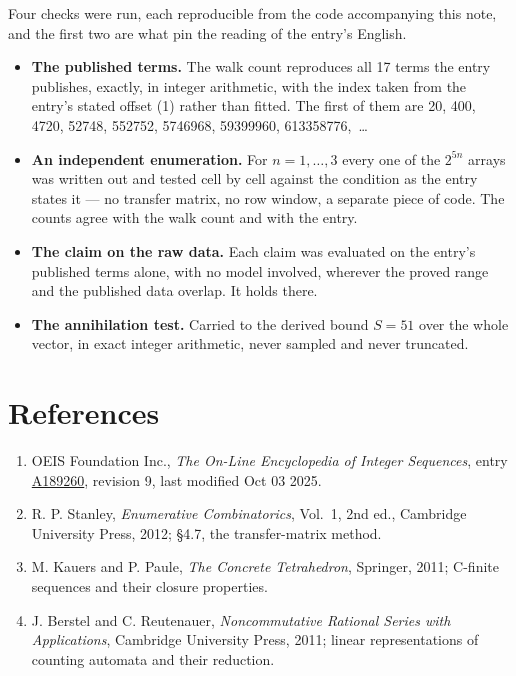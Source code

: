 \documentclass[11pt]{article}
\theoremstyle{definition}
\begin{document}
Four checks were run, each reproducible from the code accompanying this note, and the first two are what pin the reading of the entry's English.

\begin{itemize}

\item {\bfseries The published terms.} The walk count reproduces all 17 terms the entry publishes, exactly, in integer arithmetic, with the index taken from the entry's stated offset (1) rather than fitted. The first of them are 20, 400, 4720, 52748, 552752, 5746968, 59399960, 613358776,~\dots

\item {\bfseries An independent enumeration.} For $n = 1,\dots,3$ every one of the $2^{5n}$ arrays was written out and tested cell by cell against the condition as the entry states it --- no transfer matrix, no row window, a separate piece of code. The counts agree with the walk count and with the entry.

\item {\bfseries The claim on the raw data.} Each claim was evaluated on the entry's published terms alone, with no model involved, wherever the proved range and the published data overlap. It holds there.

\item {\bfseries The annihilation test.} Carried to the derived bound $S = 51$ over the whole vector, in exact integer arithmetic, never sampled and never truncated.

\end{itemize}

\section{References}

\begin{enumerate}

\item OEIS Foundation Inc., \emph{The On-Line Encyclopedia of Integer Sequences}, entry \href{https://oeis.org/A189260}{A189260}, revision 9, last modified Oct 03 2025.

\item R. P. Stanley, \emph{Enumerative Combinatorics}, Vol.~1, 2nd ed., Cambridge University Press, 2012; \S4.7, the transfer-matrix method.

\item M. Kauers and P. Paule, \emph{The Concrete Tetrahedron}, Springer, 2011; C-finite sequences and their closure properties.

\item J. Berstel and C. Reutenauer, \emph{Noncommutative Rational Series with Applications}, Cambridge University Press, 2011; linear representations of counting automata and their reduction.

\end{enumerate}
\end{document}
